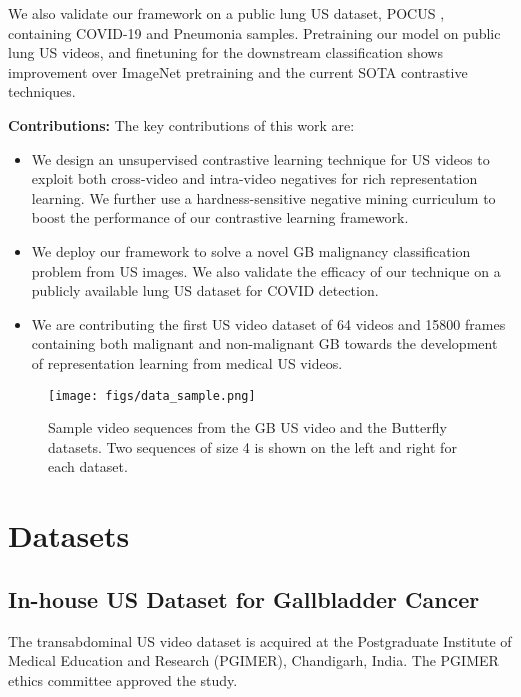 \documentclass[runningheads]{llncs}
\newcommand{\myfirstpara}[1]{\par \noindent \textbf{#1:}}
\newcommand{\mypara}[1]{ \myfirstpara{#1}}
\begin{document}
We also validate our framework on a public lung US dataset, POCUS \cite{pocus}, containing COVID-19 and Pneumonia samples. Pretraining our model on public lung US videos, and finetuning for the downstream classification shows improvement over ImageNet pretraining and the current SOTA contrastive techniques.

\mypara{Contributions} The key contributions of this work are:
\begin{itemize}
\itemsep0em
	\item  We design an unsupervised contrastive learning technique for US videos to exploit both cross-video and intra-video negatives for rich representation learning. We further use a hardness-sensitive negative mining curriculum to boost the performance of our contrastive learning framework.
	\item We deploy our framework to solve a novel GB malignancy classification problem from US images. We also validate the efficacy of our technique on a publicly available lung US dataset for COVID detection.
	\item We are contributing the first US video dataset of 64 videos and 15800 frames containing both malignant and non-malignant GB towards the development of representation learning from medical US videos.
\end{itemize}

%
\begin{figure}[t]
    \centering
    \texttt{[image: figs/data\_sample.png]}
    \caption{Sample video sequences from the GB US video and the Butterfly \cite{butterfly} datasets. Two sequences of size 4 is shown on the left and right for each dataset.}
    \label{fig:data_sample}
\end{figure}
%
\section{Datasets}
%
\subsection{In-house US Dataset for Gallbladder Cancer}
%
The transabdominal US video dataset is acquired at the Postgraduate Institute of Medical Education and Research (PGIMER), Chandigarh, India. The PGIMER ethics committee approved the study.
\end{document}
